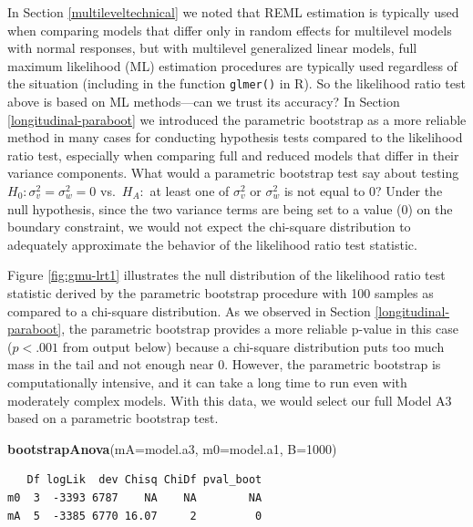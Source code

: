 \documentclass[
]{krantz}
\newenvironment{Shaded}{\begin{snugshade}}{\end{snugshade}}
\newcommand{\DataTypeTok}[1]{\textcolor[rgb]{0.27,0.27,0.27}{#1}}
\newcommand{\DecValTok}[1]{\textcolor[rgb]{0.06,0.06,0.06}{#1}}
\newcommand{\KeywordTok}[1]{\textcolor[rgb]{0.27,0.27,0.27}{\textbf{#1}}}
\newcommand{\NormalTok}[1]{#1}
\begin{document}
In Section \ref{multileveltechnical} we noted that REML estimation is typically used when comparing models that differ only in random effects for multilevel models with normal responses, but with multilevel generalized linear models, full maximum likelihood (ML) estimation procedures are typically used regardless of the situation (including in the function \texttt{glmer()} in R). So the likelihood ratio test above is based on ML methods---can we trust its accuracy? In Section \ref{longitudinal-paraboot} we introduced the parametric bootstrap  as a more reliable method in many cases for conducting hypothesis tests compared to the likelihood ratio test, especially when comparing full and reduced models that differ in their variance components. What would a parametric bootstrap test say about testing \(H_{0}: \sigma_{v}^{2}=\sigma_{w}^{2}=0\) vs.~\(H_{A}:\) at least one of \(\sigma_{v}^{2}\) or \(\sigma_{w}^{2}\) is not equal to 0? Under the null hypothesis, since the two variance terms are being set to a value (0) on the boundary constraint, we would not expect the chi-square distribution to adequately approximate the behavior of the likelihood ratio test statistic.

Figure \ref{fig:gmu-lrt1} illustrates the null distribution of the likelihood ratio test statistic derived by the parametric bootstrap procedure with 100 samples as compared to a chi-square distribution. As we observed in Section \ref{longitudinal-paraboot}, the parametric bootstrap provides a more reliable p-value in this case (\(p<.001\) from output below) because a chi-square distribution puts too much mass in the tail and not enough near 0. However, the parametric bootstrap is computationally intensive, and it can take a long time to run even with moderately complex models. With this data, we would select our full Model A3 based on a parametric bootstrap test.

\begin{Shaded}
\begin{Highlighting}[]
\KeywordTok{bootstrapAnova}\NormalTok{(}\DataTypeTok{mA=}\NormalTok{model.a3, }\DataTypeTok{m0=}\NormalTok{model.a1, }\DataTypeTok{B=}\DecValTok{1000}\NormalTok{)}
\end{Highlighting}
\end{Shaded}

\begin{verbatim}
   Df logLik  dev Chisq ChiDf pval_boot
m0  3  -3393 6787    NA    NA        NA
mA  5  -3385 6770 16.07     2         0
\end{verbatim}
\end{document}
